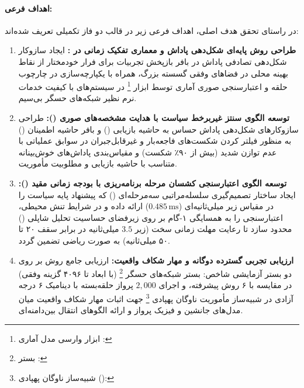 \documentclass[oneside,openany,phd]{TMU-Thesis}
\begin{document}
\paragraph{اهداف فرعی:}
در راستای تحقق هدف اصلی، اهداف فرعی زیر در قالب دو فاز تکمیلی تعریف شده‌اند:

\begin{enumerate}
    \item \textbf{طراحی روش پایه‌ای شکل‌دهی پاداش و معماری تفکیک زمانی در :} ایجاد سازوکار شکل‌دهی تصادفی پاداش در بافر بازپخش تجربیات برای فرار خودمختار از نقاط بهینه محلی در فضاهای وفقی گسسته بزرگ، همراه با یکپارچه‌سازی در چارچوب حلقه  و اعتبارسنجی صوری آماری توسط ابزار \footnote{ابزار وارسی مدل آماری : } در سیستم‌های با کیفیت خدمات نرم نظیر شبکه‌های حسگر بی‌سیم.
    
    \item \textbf{توسعه الگوی سنتز غیربرخط سیاست با هدایت مشخصه‌های صوری (\sgos):} طراحی سازوکارهای شکل‌دهی پاداش حساس به حاشیه بازیابی (\mursdrl) و بافر حاشیه اطمینان (\cmrsdrl) به منظور فیلتر کردن شکست‌های فاجعه‌بار و غیرقابل‌جبران در سوابق عملیاتی با عدم توازن شدید (بیش از ۹۰٪ شکست) و مقیاس‌بندی پاداش‌های خوش‌بینانه متناسب با حاشیه بازیابی و مطلوبیت مأموریت.
    
    \item \textbf{توسعه الگوی اعتبارسنجی کشسان مرحله برنامه‌ریزی با بودجه زمانی مقید (\caepv):} ایجاد ساختار تصمیم‌گیری سلسله‌مراتبی سه‌مرحله‌ای (\pgalr) که پیشنهاد پایه سیاست را در مقیاس زیر میلی‌ثانیه‌ای ($0.485\,\text{ms}$) ارائه داده و در شرایط تنش محیطی، اعتبارسنجی را به همسایگی ۱-گام بر روی زیرفضای حساسیت تحلیل شاپلی () محدود سازد تا رعایت مهلت زمانی سخت (زیر $3.5$ میلی‌ثانیه در برابر سقف ۲۰ تا ۵۰ میلی‌ثانیه) به صورت ریاضی تضمین گردد.
    
    \item \textbf{ارزیابی تجربی گسترده دوگانه و مهار شکاف واقعیت:} ارزیابی جامع روش بر روی دو بستر آزمایشی شاخص: بستر شبکه‌های حسگر \footnote{بستر : } (با ابعاد تا ۴۰۹۶ گزینه وفقی) در مقایسه با ۶ روش پیشرفته، و اجرای $2{,}000$ پرواز حلقه‌بسته با دینامیک ۶ درجه آزادی در شبیه‌ساز مأموریت ناوگان پهپادی \footnote{شبیه‌ساز ناوگان پهپادی  (): } جهت اثبات مهار شکاف واقعیت میان مدل‌های جانشین و فیزیک پرواز و ارائه الگوهای انتقال بین‌دامنه‌ای.
\end{enumerate}
\end{document}
